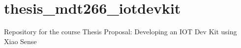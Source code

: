 \chapter{thesis\+\_\+mdt266\+\_\+iotdevkit}
\hypertarget{md__r_e_a_d_m_e}{}\label{md__r_e_a_d_m_e}
\label{md__r_e_a_d_m_e_autotoc_md0}%
%


Repository for the course Thesis Proposal\+: Developing an IOT Dev Kit using Xiao Sense 